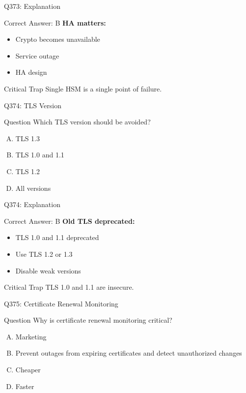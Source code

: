 \documentclass{beamer}
\begin{document}
	\begin{frame}{Q373: Explanation}
		\begin{block}{Correct Answer: B}
			\textbf{HA matters:}
			\begin{itemize}
				\item Crypto becomes unavailable
				\item Service outage
				\item HA design
			\end{itemize}
		\end{block}
		\begin{alertblock}{Critical Trap}
			Single HSM is a single point of failure.
		\end{alertblock}
	\end{frame}
	
	\begin{frame}{Q374: TLS Version}
		\begin{block}{Question}
			Which TLS version should be avoided?
		\end{block}
		\begin{enumerate}[(A)]
			\item TLS 1.3
			\item TLS 1.0 and 1.1
			\item TLS 1.2
			\item All versions
		\end{enumerate}
	\end{frame}
	
	\begin{frame}{Q374: Explanation}
		\begin{block}{Correct Answer: B}
			\textbf{Old TLS deprecated:}
			\begin{itemize}
				\item TLS 1.0 and 1.1 deprecated
				\item Use TLS 1.2 or 1.3
				\item Disable weak versions
			\end{itemize}
		\end{block}
		\begin{alertblock}{Critical Trap}
			TLS 1.0 and 1.1 are insecure.
		\end{alertblock}
	\end{frame}
	
	\begin{frame}{Q375: Certificate Renewal Monitoring}
		\begin{block}{Question}
			Why is certificate renewal monitoring critical?
		\end{block}
		\begin{enumerate}[(A)]
			\item Marketing
			\item Prevent outages from expiring certificates and detect unauthorized changes
			\item Cheaper
			\item Faster
		\end{enumerate}
	\end{frame}
	
\end{document}

